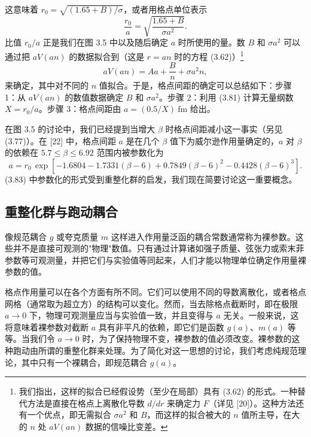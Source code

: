 这意味着 $r_0 = \sqrt{(1.65 + B)/\sigma}$，或者用格点单位表示
\begin{equation}
  \frac{r_0}{a} = \sqrt{\frac{1.65 + B}{\sigma a^2}} .
\end{equation}
比值 $r_0/a$ 正是我们在图 3.5 中以及随后确定 $a$ 时所使用的量。数 $B$ 和 $\sigma a^2$ 可以通过把 $aV(an)$ 的数据拟合到（这是 $r = an$ 时的方程 (3.62)）\footnote{我们指出，这样的拟合已经假设势（至少在局部）具有 (3.62) 的形式。一种替代方法是直接在格点上离散化导数 $d/dr$ 来确定力 $F$（详见 [20]）。这种方法还有一个优点，即无需拟合 $\sigma a^2$ 和 $B$，而这样的拟合被大的 $n$ 值所主导，在大的 $n$ 处 $aV(an)$ 数据的信噪比变差。}
\begin{equation}
  aV(an) = Aa + \frac{B}{n} + \sigma a^2 n ,
\end{equation}
来确定，其中对不同的 $n$ 值拟合。于是，格点间距的确定可以总结如下：步骤 1：从 $aV(an)$ 的数值数据确定 $B$ 和 $\sigma a^2$。步骤 2：利用 (3.81) 计算无量纲数 $X = r_0/a$。步骤 3：格点间距由 $a = (0.5/X)\ \mathrm{fm}$ 给出。

在图 3.5 的讨论中，我们已经提到当增大 $\beta$ 时格点间距减小这一事实（另见 (3.77)）。在 [22] 中，格点间距 $a$ 是在几个 $\beta$ 值下为威尔逊作用量确定的，$a$ 对 $\beta$ 的依赖在 $5.7 \leq \beta \leq 6.92$ 范围内被参数化为
\begin{equation}
  a = r_0\,\exp\!\left[-1.6804 - 1.7331(\beta - 6) + 0.7849(\beta - 6)^2
    - 0.4428(\beta - 6)^3\right] .
\end{equation}
(3.83) 中参数化的形式受到重整化群的启发，我们现在简要讨论这一重要概念。

\subsection{重整化群与跑动耦合}

像规范耦合 $g$ 或夸克质量 $m$ 这样进入作用量泛函的耦合常数通常称为裸参数。这些并不是直接可观测的"物理"数值。只有通过计算诸如强子质量、弦张力或索末菲参数等可观测量，并把它们与实验值等同起来，人们才能以物理单位确定作用量裸参数的值。

格点作用量可以在各个方面有所不同。它们可以使用不同的导数离散化，或者格点网格（通常取为超立方）的结构可以变化。然而，当去除格点截断时，即在极限 $a \to 0$ 下，物理可观测量应当与实验值一致，并且变得与 $a$ 无关。一般来说，这将意味着裸参数对截断 $a$ 具有非平凡的依赖，即它们是函数 $g(a)$、$m(a)$ 等等。当我们令 $a \to 0$ 时，为了保持物理不变，裸参数的值必须改变。裸参数的这种跑动由所谓的重整化群来处理。为了简化对这一思想的讨论，我们考虑纯规范理论，其中只有一个裸耦合，即规范耦合 $g(a)$。

